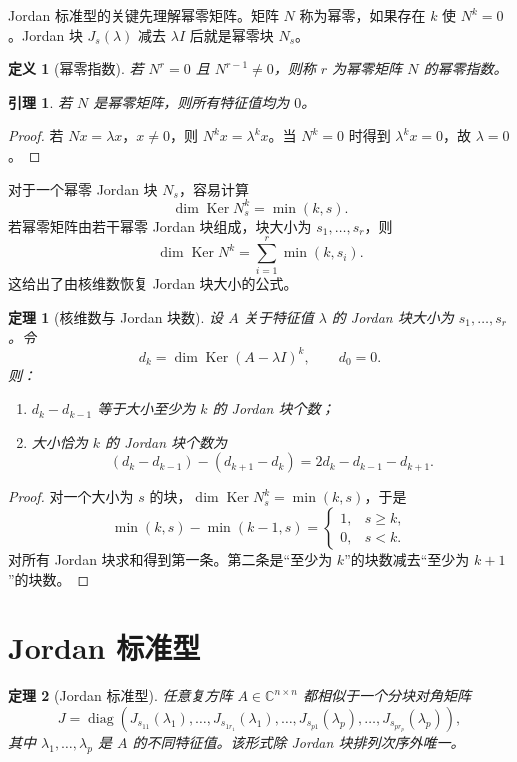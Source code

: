 \documentclass[UTF8,openany,zihao=-4]{ctexbook}
\theoremstyle{cnplain}
\newtheorem{definition}{定义}[chapter]
\newtheorem{theorem}{定理}[chapter]
\newtheorem{lemma}{引理}[chapter]
\newcommand{\C}{\mathbb C}
\newcommand{\Ker}{\operatorname{Ker}}
\newcommand{\diag}{\operatorname{diag}}
\begin{document}
Jordan 标准型的关键先理解幂零矩阵。矩阵 $N$ 称为幂零，如果存在 $k$ 使 $N^k=0$。Jordan 块 $J_s(\lambda)$ 减去 $\lambda I$ 后就是幂零块 $N_s$。

\begin{definition}[幂零指数]
若 $N^r=0$ 且 $N^{r-1}\ne0$，则称 $r$ 为幂零矩阵 $N$ 的幂零指数。
\end{definition}

\begin{lemma}
若 $N$ 是幂零矩阵，则所有特征值均为 $0$。
\end{lemma}

\begin{proof}
若 $Nx=\lambda x$，$x\ne0$，则 $N^kx=\lambda^kx$。当 $N^k=0$ 时得到 $\lambda^kx=0$，故 $\lambda=0$。
\end{proof}

对于一个幂零 Jordan 块 $N_s$，容易计算
\[
\dim\Ker N_s^k=\min(k,s).
\]
若幂零矩阵由若干幂零 Jordan 块组成，块大小为 $s_1,
\ldots,s_r$，则
\[
\dim\Ker N^k=\sum_{i=1}^r \min(k,s_i).
\]
这给出了由核维数恢复 Jordan 块大小的公式。

\begin{theorem}[核维数与 Jordan 块数]
设 $A$ 关于特征值 $\lambda$ 的 Jordan 块大小为 $s_1,
\ldots,s_r$。令
\[
d_k=\dim\Ker(A-\lambda I)^k,
\qquad d_0=0.
\]
则：
\begin{enumerate}
  \item $d_k-d_{k-1}$ 等于大小至少为 $k$ 的 Jordan 块个数；
  \item 大小恰为 $k$ 的 Jordan 块个数为
  \[
  (d_k-d_{k-1})-(d_{k+1}-d_k)=2d_k-d_{k-1}-d_{k+1}.
  \]
\end{enumerate}
\end{theorem}

\begin{proof}
对一个大小为 $s$ 的块，$\dim\Ker N_s^k=\min(k,s)$，于是
\[
\min(k,s)-\min(k-1,s)=
\begin{cases}
1,&s\ge k,\\
0,&s<k.
\end{cases}
\]
对所有 Jordan 块求和得到第一条。第二条是“至少为 $k$”的块数减去“至少为 $k+1$”的块数。
\end{proof}

\section{Jordan 标准型}

\begin{theorem}[Jordan 标准型]
任意复方阵 $A\in\C^{n\times n}$ 都相似于一个分块对角矩阵
\[
J=\diag(J_{s_{11}}(\lambda_1),
\ldots,J_{s_{1r_1}}(\lambda_1),
\ldots,
J_{s_{p1}}(\lambda_p),
\ldots,J_{s_{pr_p}}(\lambda_p)),
\]
其中 $\lambda_1,
\ldots,\lambda_p$ 是 $A$ 的不同特征值。该形式除 Jordan 块排列次序外唯一。
\end{theorem}
\end{document}
